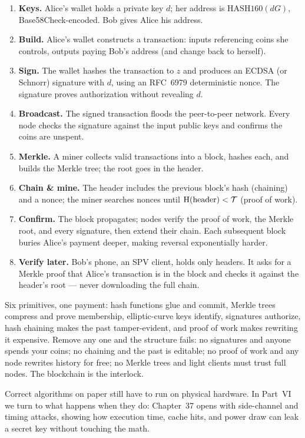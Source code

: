 \begin{enumerate}
  \item \textbf{Keys.} Alice's wallet holds a private key $d$; her address is $\mathrm{HASH160}(dG)$, Base58Check-encoded. Bob gives Alice his address.
  \item \textbf{Build.} Alice's wallet constructs a transaction: inputs referencing coins she controls, outputs paying Bob's address (and change back to herself).
  \item \textbf{Sign.} The wallet hashes the transaction to $z$ and produces an ECDSA (or Schnorr) signature with $d$, using an RFC~6979 deterministic nonce. The signature proves authorization without revealing $d$.
  \item \textbf{Broadcast.} The signed transaction floods the peer-to-peer network. Every node checks the signature against the input public keys and confirms the coins are unspent.
  \item \textbf{Merkle.} A miner collects valid transactions into a block, hashes each, and builds the Merkle tree; the root goes in the header.
  \item \textbf{Chain \& mine.} The header includes the previous block's hash (chaining) and a nonce; the miner searches nonces until $\operatorname{H}(\text{header}) < \mathcal{T}$ (proof of work).
  \item \textbf{Confirm.} The block propagates; nodes verify the proof of work, the Merkle root, and every signature, then extend their chain. Each subsequent block buries Alice's payment deeper, making reversal exponentially harder.
  \item \textbf{Verify later.} Bob's phone, an SPV client, holds only headers. It asks for a Merkle proof that Alice's transaction is in the block and checks it against the header's root --- never downloading the full chain.
\end{enumerate}

Six primitives, one payment: hash functions glue and commit, Merkle trees compress and prove membership, elliptic-curve keys identify, signatures authorize, hash chaining makes the past tamper-evident, and proof of work makes rewriting it expensive. Remove any one and the structure fails: no signatures and anyone spends your coins; no chaining and the past is editable; no proof of work and any node rewrites history for free; no Merkle trees and light clients must trust full nodes. The blockchain is the interlock.

Correct algorithms on paper still have to run on physical hardware. In Part~VI we turn to what happens when they do: Chapter~37 opens with side-channel and timing attacks, showing how execution time, cache hits, and power draw can leak a secret key without touching the math.

